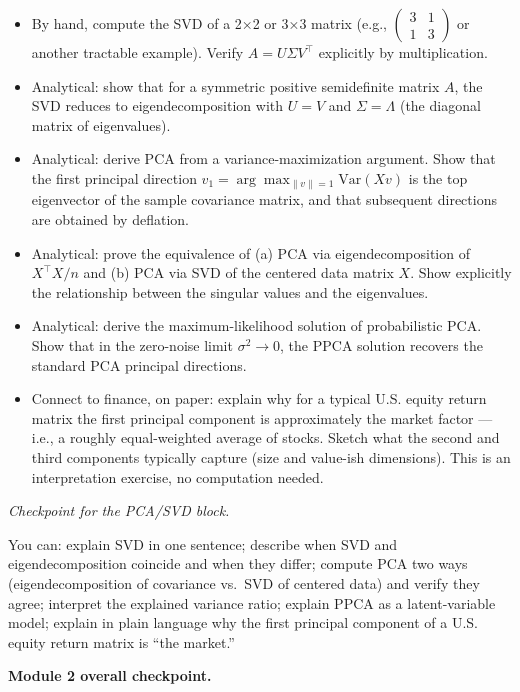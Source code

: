 \begin{itemize}
\tightlist
\item
  By hand, compute the SVD of a 2×2 or 3×3 matrix (e.g.,
  \(\begin{pmatrix} 3 & 1 \\ 1 & 3 \end{pmatrix}\) or another tractable
  example). Verify \(A = U \Sigma V^\top\) explicitly by multiplication.
\item
  Analytical: show that for a symmetric positive semidefinite matrix
  \(A\), the SVD reduces to eigendecomposition with \(U = V\) and
  \(\Sigma = \Lambda\) (the diagonal matrix of eigenvalues).
\item
  Analytical: derive PCA from a variance-maximization argument. Show
  that the first principal direction
  \(v_1 = \arg\max_{\|v\|=1} \text{Var}(X v)\) is the top eigenvector of
  the sample covariance matrix, and that subsequent directions are
  obtained by deflation.
\item
  Analytical: prove the equivalence of (a) PCA via eigendecomposition of
  \(X^\top X / n\) and (b) PCA via SVD of the centered data matrix
  \(X\). Show explicitly the relationship between the singular values
  and the eigenvalues.
\item
  Analytical: derive the maximum-likelihood solution of probabilistic
  PCA. Show that in the zero-noise limit \(\sigma^2 \to 0\), the PPCA
  solution recovers the standard PCA principal directions.
\item
  Connect to finance, on paper: explain why for a typical U.S. equity
  return matrix the first principal component is approximately the
  market factor --- i.e., a roughly equal-weighted average of stocks.
  Sketch what the second and third components typically capture (size
  and value-ish dimensions). This is an interpretation exercise, no
  computation needed.
\end{itemize}

\emph{Checkpoint for the PCA/SVD block.}

You can: explain SVD in one sentence; describe when SVD and
eigendecomposition coincide and when they differ; compute PCA two ways
(eigendecomposition of covariance vs.~SVD of centered data) and verify
they agree; interpret the explained variance ratio; explain PPCA as a
latent-variable model; explain in plain language why the first principal
component of a U.S. equity return matrix is ``the market.''

\textbf{Module 2 overall checkpoint.}

